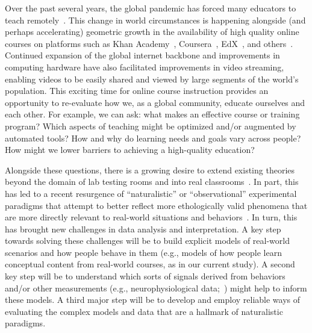 \documentclass[10pt]{article}
\begin{document}
Over the past several years, the global pandemic has forced many educators to
teach remotely~\citep{MoseEtal21, ShimLee20, KawaEtal21, Whal20}. This change
in world circumstances is happening alongside (and perhaps accelerating)
geometric growth in the availability of high quality online courses on
platforms such as Khan Academy~\citep{Khan04}, Coursera~\citep{Youn12},
EdX~\citep{Kolo13}, and others~\citep{RhoaEtal13}. Continued expansion of the
global internet backbone and improvements in computing hardware have also
facilitated improvements in video streaming, enabling videos to be easily
shared and viewed by large segments of the world's population. This
exciting time for online course instruction provides an opportunity to
re-evaluate how we, as a global community, educate ourselves and each other.
For example, we can ask: what makes an effective course or training program?
Which aspects of teaching might be optimized and/or augmented by automated tools? How and why do
learning needs and goals vary across people? How might we lower barriers to
achieving a high-quality education?

Alongside these questions, there is a growing desire to extend existing
theories beyond the domain of lab testing rooms and into real
classrooms~\citep{Kauf03}. In part, this has led to a recent resurgence of
``naturalistic'' or ``observational'' experimental paradigms that attempt to
better reflect more ethologically valid phenomena that are more directly
relevant to real-world situations and behaviors~\citep{NastEtal20}. In turn,
this has brought new challenges in data analysis and interpretation. A key step
towards solving these challenges will be to build explicit models of real-world
scenarios and how people behave in them (e.g., models of how people learn
conceptual content from real-world courses, as in our current study). A second
key step will be to understand which sorts of signals derived from behaviors
and/or other measurements (e.g., neurophysiological data;~\citealp{NguyEtal22,
MeshEtal20, PoulEtal17, BeviEtal19, DikkEtal17}) might help to inform these
models. A third major step will be to develop and employ reliable ways of
evaluating the complex models and data that are a hallmark of naturalistic
paradigms.
\end{document}
